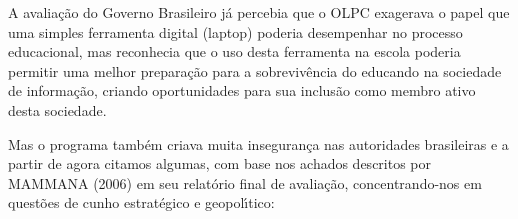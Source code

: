 \documentclass[
12pt,		%
openright,	%
twoside,  %
a4paper,			%
chapter=TITLE,		%
english,			%
french,				%
spanish,			%
brazil				%
]{USPSC-classe/USPSC}
\begin{document}
A avalia\c{c}\~ao do Governo Brasileiro j\'a percebia que o OLPC exagerava o papel que uma simples ferramenta digital (laptop) poderia desempenhar no processo educacional, mas reconhecia que o uso desta ferramenta na escola poderia \textquotedbl permitir uma melhor prepara\c{c}\~ao para a sobreviv\^encia do educando na sociedade de informa\c{c}\~ao, criando oportunidades para sua inclus\~ao como membro ativo desta sociedade\textquotedbl .

















Mas o programa tamb\'em criava muita inseguran\c{c}a nas autoridades brasileiras e a partir de agora citamos algumas, com base nos achados descritos por MAMMANA (2006) em seu relat\'orio final de avalia\c{c}\~ao, concentrando-nos em quest\~oes de cunho estrat\'egico e geopol\'{\i}tico:
\end{document}
